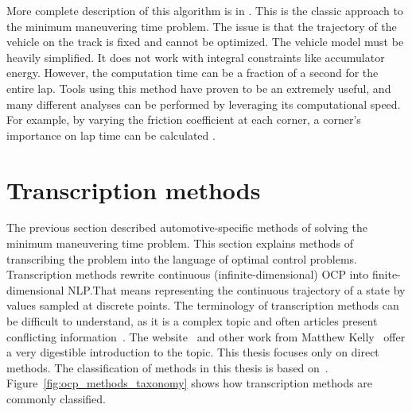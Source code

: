 More complete description of this algorithm is in \cite{casanovaMinimumTimeVehicle2000}.
This is the classic approach to the minimum maneuvering time problem. The issue is that the trajectory of the vehicle on the track is fixed and cannot be optimized. The vehicle model must be heavily simplified. It does not work with integral constraints like accumulator energy. However, the computation time can be a fraction of a second for the entire lap. Tools using this method have proven to be an extremely useful, and many different analyses can be performed by leveraging its computational speed. For example, by varying the friction coefficient at each corner, a corner's importance on lap time can be calculated \cite{optimumg_corner_importance}.
\section{Transcription methods}
The previous section described automotive-specific methods of solving the minimum maneuvering time problem. This section explains methods of transcribing the problem into the language of optimal control problems.
Transcription methods rewrite continuous (infinite-dimensional) OCP into finite-dimensional NLP.\@ That means representing the continuous trajectory of a state by values sampled at discrete points.
The terminology of transcription methods can be difficult to understand, as it is a complex topic and often articles present conflicting information~\cite{kelly_traj_opt_terminology}. The website~\cite{kelly_traj_opt_terminology} and other work from Matthew Kelly~\cite{kelly_traj_opt_video} offer a very digestible introduction to the topic. This thesis focuses only on direct methods. The classification of methods in this thesis is based on~\cite{kelly_traj_opt_terminology}. Figure~\ref{fig:ocp_methods_taxonomy} shows how transcription methods are commonly classified.

